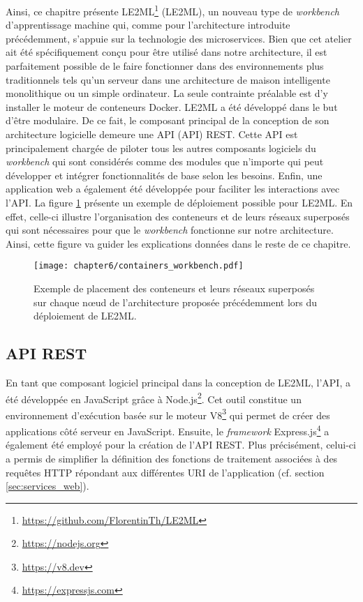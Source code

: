 Ainsi, ce chapitre présente \acs{LE2ML}\footnote{\url{https://github.com/FlorentinTh/LE2ML}} (\acl{LE2ML}), un nouveau type de \textit{workbench} d'apprentissage machine qui, comme pour l'architecture introduite précédemment, s'appuie sur la technologie des microservices. Bien que cet atelier ait été spécifiquement conçu pour être utilisé dans notre architecture, il est parfaitement possible de le faire fonctionner dans des environnements plus traditionnels tels qu'un serveur dans une architecture de maison intelligente monolithique ou un simple ordinateur. La seule contrainte préalable est d'y installer le moteur de conteneurs Docker. LE2ML a été développé dans le but d'être modulaire. De ce fait, le composant principal de la conception de son architecture logicielle demeure une \acs{API} (\acl{API}) \acs{REST}. Cette API est principalement chargée de piloter tous les autres composants logiciels du \textit{workbench} qui sont considérés comme des modules que n'importe qui peut développer et intégrer fonctionnalités de base selon les besoins. Enfin, une application web a également été développée pour faciliter les interactions avec l'\acs{API}. La figure \ref{fig:containers_workbench} présente un exemple de déploiement possible pour \acs{LE2ML}. En effet, celle-ci illustre l'organisation des conteneurs et de leurs réseaux superposés qui sont nécessaires pour que le \textit{workbench} fonctionne sur notre architecture. Ainsi, cette figure va guider les explications données dans le reste de ce chapitre.

\begin{figure}[H]
	\centering
	\texttt{[image: chapter6/containers\_workbench.pdf]}
        \caption{Exemple de placement des conteneurs et leurs réseaux superposés sur chaque n\oe{}ud de l'architecture proposée précédemment lors du déploiement de \acs{LE2ML}.}
	\label{fig:containers_workbench}
\end{figure}

\subsection{\acs{API} \acs{REST}}

En tant que composant logiciel principal dans la conception de \acs{LE2ML}, l'\acs{API}, a été développée en JavaScript grâce à Node.js\footnote{\url{https://nodejs.org}}. Cet outil constitue un environnement d'exécution basée sur le moteur V8\footnote{\url{https://v8.dev}} qui permet de créer des applications côté serveur en JavaScript. Ensuite, le \textit{framework} Express.js\footnote{\url{https://expressjs.com}} a également été employé pour la création de l'\acs{API} \acs{REST}. Plus précisément, celui-ci a permis de simplifier la définition des fonctions de traitement associées à des requêtes \acs{HTTP} répondant aux différentes \acs{URI} de l'application (cf. section \ref{sec:services_web}).

